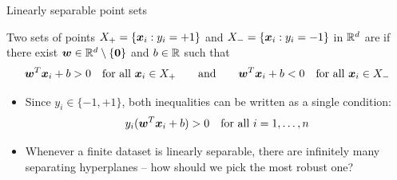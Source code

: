 \documentclass[aspectratio=169]{beamer}\usepackage[]{graphicx}\usepackage[]{xcolor}
\begin{document}
\begin{frame}{Linearly separable point sets}
    \begin{importantdefinition}
        Two sets of points $X_+ = \{\bm{x}_i : y_i = +1\}$ and $X_- = \{\bm{x}_i : y_i = -1\}$ in $\mathbb{R}^d$ are  if there exist $\bw \in \IR^d \setminus \{\b0\}$ and $b \in \mathbb{R}$ such that
        \[
            \bm{w}^T \bm{x}_i + b > 0 \quad \text{for all } \bm{x}_i \in X_+ \qquad \text{and} \qquad \bm{w}^T \bm{x}_i + b < 0 \quad \text{for all } \bm{x}_i \in X_-
        \]
    \end{importantdefinition}
    \vfill
    \begin{itemize}
        \item Since $y_i \in \{-1, +1\}$, both inequalities can be written as a single condition:
        \[
            y_i(\bm{w}^T \bm{x}_i + b) > 0 \quad \text{for all } i = 1, \ldots, n
        \]
        \item Whenever a finite dataset is linearly separable, there are infinitely many separating hyperplanes -- how should we pick the most robust one?
    \end{itemize}
\end{frame}
\end{document}
